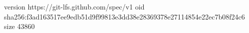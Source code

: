 version https://git-lfs.github.com/spec/v1
oid sha256:f3ad163517ee9edb51d9f99813e3dd38e28369378e27114854e22ec7b08f24c6
size 43860
